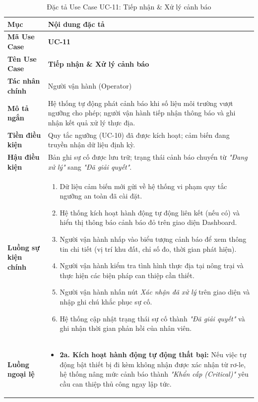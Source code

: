 \begin{table}[H]
\centering
\small
\begin{tabularx}{\textwidth}{|p{3.2cm}|X|}
\hline
\textbf{Mục} & \textbf{Nội dung đặc tả} \\ \hline
\textbf{Mã Use Case} & \textbf{UC-11} \\ \hline
\textbf{Tên Use Case} & \textbf{Tiếp nhận \& Xử lý cảnh báo} \\ \hline
\textbf{Tác nhân chính} & Người vận hành (Operator) \\ \hline
\textbf{Mô tả ngắn} & Hệ thống tự động phát cảnh báo khi số liệu môi trường vượt ngưỡng cho phép; người vận hành tiếp nhận thông báo và ghi nhận kết quả xử lý thực địa. \\ \hline
\textbf{Tiền điều kiện} & Quy tắc ngưỡng (UC-10) đã được kích hoạt; cảm biến đang truyền nhận dữ liệu định kỳ. \\ \hline
\textbf{Hậu điều kiện} & Bản ghi sự cố được lưu trữ; trạng thái cảnh báo chuyển từ \textit{"Đang xử lý"} sang \textit{"Đã giải quyết"}. \\ \hline
\textbf{Luồng sự kiện chính} & 
\begin{enumerate}[leftmargin=*, nosep]
    \item Dữ liệu cảm biến mới gửi về hệ thống vi phạm quy tắc ngưỡng an toàn đã cài đặt.
    \item Hệ thống kích hoạt hành động tự động liên kết (nếu có) và hiển thị thông báo cảnh báo đỏ trên giao diện Dashboard.
    \item Người vận hành nhấp vào biểu tượng cảnh báo để xem thông tin chi tiết (vị trí khu đất, chỉ số đo, thời gian phát hiện).
    \item Người vận hành kiểm tra tình hình thực địa tại nông trại và thực hiện các biện pháp can thiệp cần thiết.
    \item Người vận hành nhấn nút \textit{Xác nhận đã xử lý} trên giao diện và nhập ghi chú khắc phục sự cố.
    \item Hệ thống cập nhật trạng thái sự cố thành \textit{"Đã giải quyết"} và ghi nhận thời gian phản hồi của nhân viên.
\end{enumerate} \\ \hline
\textbf{Luồng ngoại lệ} & 
\begin{itemize}[leftmargin=*, nosep]
    \item \textbf{2a. Kích hoạt hành động tự động thất bại:} Nếu việc tự động bật thiết bị đi kèm không nhận được xác nhận từ rơ-le, hệ thống nâng mức cảnh báo thành \textit{"Khẩn cấp (Critical)"} yêu cầu can thiệp thủ công ngay lập tức.
\end{itemize} \\ \hline
\end{tabularx}
\caption{Đặc tả Use Case UC-11: Tiếp nhận \& Xử lý cảnh báo}
\label{tab:uc_11}
\end{table}

